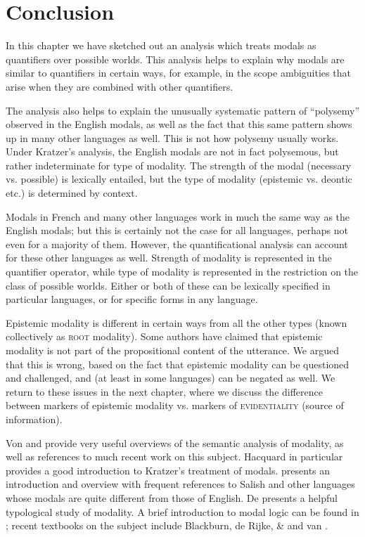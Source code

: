 \section{Conclusion}\label{sec:} %

In this chapter we have sketched out an analysis which treats modals as quantifiers over possible worlds. This analysis helps to explain why modals are similar to quantifiers in certain ways, for example, in the scope ambiguities that arise when they are combined with other quantifiers.



The analysis also helps to explain the unusually systematic pattern of “polysemy” observed in the English modals, as well as the fact that this same pattern shows up in many other languages as well. This is not how polysemy usually works. Under Kratzer’s analysis, the English modals are not in fact polysemous, but rather indeterminate for type of modality. The strength of the modal (necessary vs. possible) is lexically entailed, but the type of modality (epistemic vs. deontic etc.) is determined by context.



Modals in French and many other languages work in much the same way as the English modals; but this is certainly not the case for all languages, perhaps not even for a majority of them. However, the quantificational analysis can account for these other languages as well. Strength of modality is represented in the quantifier operator, while type of modality is represented in the restriction on the class of possible worlds. Either or both of these can be lexically specified in particular languages, or for specific forms in any language.



Epistemic modality is different in certain ways from all the other types (known collectively as \textsc{root} modality). Some authors have claimed that epistemic modality is not part of the propositional content of the utterance. We argued that this is wrong, based on the fact that epistemic modality can be questioned and challenged, and (at least in some languages) can be negated as well. We return to these issues in the next chapter, where we discuss the difference between markers of epistemic modality vs. markers of \textsc{evidentiality} (source of information).



\furtherreading



Von \citet{Fintel2006} and \citet{Hacquard2011} provide very useful overviews of the semantic analysis of modality, as well as references to much recent work on this subject. Hacquard in particular provides a good introduction to Kratzer’s treatment of modals. \citet{Matthewson2016} presents an introduction and overview with frequent references to Salish and other languages whose modals are quite different from those of English. De \citet{Haan2006} presents a helpful typological study of modality. A brief introduction to modal logic can be found in \citet{Garson2016}; recent textbooks on the subject include Blackburn, de Rijke, \& \citet{Venema2008} and van \citet{Benthem2010}.


